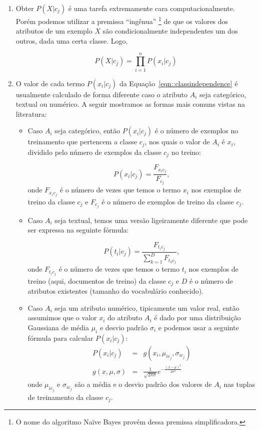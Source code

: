\begin{enumerate}
    \item Obter $P(X|c_j)$ é uma tarefa extremamente cara computacionalmente. Porém podemos utilizar a premissa ``ingênua'' \footnote{O nome do algoritmo Naïve Bayes provém dessa premissa simplificadora.} de que os valores dos atributos de um exemplo $X$ são condicionalmente independentes um dos outros, dada uma certa classe. Logo,

\begin{equation}\label{eqn::classindependence}
   P(X|c_{j}) = \prod^{n}_{i=1}{P(x_i|c_j) }
\end{equation}

\item O valor de cada termo $P(x_i|c_j)$ da Equação~\ref{eqn::classindependence} é usualmente calculado de forma diferente caso o atributo $A_i$ seja categórico, textual ou numérico. A seguir mostramos as formas mais comuns vistas na literatura:
    \begin{itemize}

        \item Caso $A_i$ seja categórico, então $P(x_i|c_j)$ é o número de exemplos no treinamento que pertencem a classe $c_j$, nos quais o valor de $A_i$ é $x_i$, dividido pelo número de exemplos da classe $c_j$ no treino:

    \begin{equation}\label{eqn::nbcattexto}
        P(x_i|c_j) = \frac{ F_{x_{i}c_{j}} }{ F_{c_{j}} },
    \end{equation}
        onde $F_{x_{i}c_{j}}$ é o número de vezes que temos o termo $x_i$ nos exemplos de treino da classe $c_j$ e $F_{c_{j}}$ é o número de exemplos de treino da classe $c_j$.
        
        \item Caso $A_i$ seja textual, temos uma versão ligeiramente diferente que pode ser expressa na seguinte fórmula:

    \begin{equation}\label{eqn::nbcattexto}
        P(t_i|c_j) = \frac{ F_{t_{i}c_{j}} }{ \sum\limits^{D}_{k = 1} { } F_{t_{k}c_{j}} },
    \end{equation}
        onde $F_{t_{i}c_{j}}$ é o número de vezes que temos o termo $t_i$ nos exemplos de treino (aqui, documentos de treino) da classe $c_j$ e $D$ é o número de atributos existentes (tamanho do vocabulário conhecido).

        \item Caso $A_i$ seja um atributo numérico, tipicamente um valor real, então assumimos que o valor $x_i$ do atributo $A_i$ é dado por uma distribuição Gaussiana de média $\mu_i$ e desvio padrão $\sigma_i$ e podemos usar a seguinte fórmula para calcular $P(x_i|c_j)$:
    \begin{eqnarray}\label{eqn::nbnumerico}
        P(x_i|c_j) & = & g(x_i, \mu_{ic_j}, \sigma_{ic_j})  \\
        g(x, \mu, \sigma) & = & \frac {1} { \sqrt{2\pi\sigma} } e^{ -\frac{(x-\mu)^2}{2\sigma^2}  } 
    \end{eqnarray}
        onde $\mu_{ic_j}$ e $\sigma_{ic_j}$ são a média e o desvio padrão dos valores de $A_i$ nas tuplas de treinamento da classe $c_j$. 


\end{itemize}
\end{enumerate}

